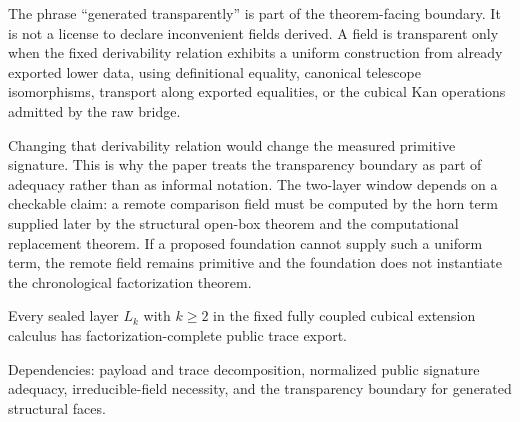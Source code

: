 \documentclass{lmcs}
\begin{document}
\begin{rem}
The phrase ``generated transparently'' is part of the theorem-facing boundary.  It is not a
license to declare inconvenient fields derived.  A field is transparent only when the fixed
derivability relation exhibits a uniform construction from already exported lower data, using
definitional equality, canonical telescope isomorphisms, transport along exported equalities,
or the cubical Kan operations admitted by the raw bridge.

Changing that derivability relation would change the measured primitive signature.  This is
why the paper treats the transparency boundary as part of adequacy rather than as informal
notation.  The two-layer window depends on a checkable claim: a remote comparison field
must be computed by the horn term supplied later by the structural open-box theorem and the
computational replacement theorem.  If a proposed foundation cannot supply such a uniform
term, the remote field remains primitive and the foundation does not instantiate the
chronological factorization theorem.
\end{rem}

\begin{thm}
Every sealed layer \(L_k\) with \(k\geq 2\) in the fixed fully coupled cubical extension calculus
has factorization-complete public trace export.
\end{thm}

Dependencies: payload and trace decomposition, normalized public signature adequacy,
irreducible-field necessity, and the transparency boundary for generated structural faces.
\end{document}
